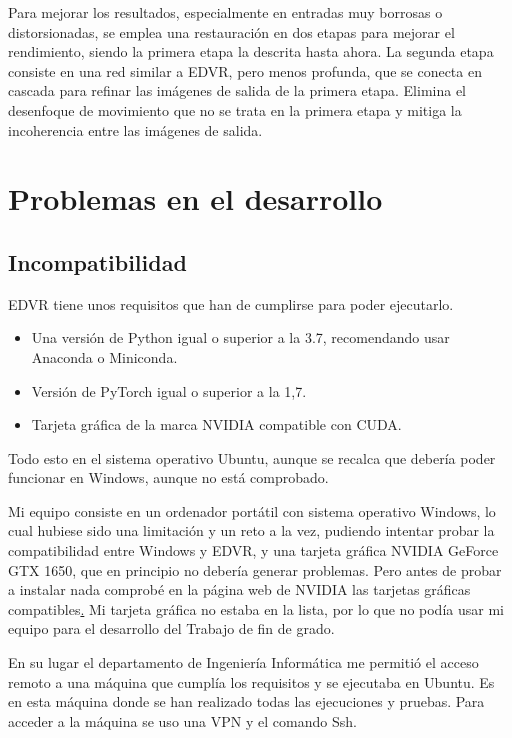         Para mejorar los resultados, especialmente en entradas muy borrosas o distorsionadas, se emplea una restauración en dos etapas para mejorar el rendimiento, siendo la primera etapa la descrita hasta ahora. La segunda etapa consiste en una red similar a EDVR, pero menos profunda, que se conecta en cascada para refinar las imágenes de salida de la primera etapa. Elimina el desenfoque de movimiento que no se trata en la primera etapa y mitiga la incoherencia entre las imágenes de salida.

\section{Problemas en el desarrollo}   
    
    \subsection {Incompatibilidad}
    EDVR tiene unos requisitos que han de cumplirse para poder ejecutarlo.
     \begin{itemize}
        \item Una versión de Python igual o superior a la 3.7, recomendando usar Anaconda o Miniconda.
        \item Versión de PyTorch igual o superior a la 1,7.
        \item Tarjeta gráfica de la marca NVIDIA compatible con CUDA.
    \end{itemize}
    Todo esto en el sistema operativo Ubuntu, aunque se recalca que debería poder funcionar en Windows, aunque no está comprobado.

    Mi equipo consiste en un ordenador portátil con sistema operativo Windows, lo cual hubiese sido una limitación y un reto a la vez, pudiendo intentar probar la compatibilidad entre Windows y EDVR, y una tarjeta gráfica NVIDIA GeForce GTX 1650, que en principio no debería generar problemas. Pero antes de probar a instalar nada comprobé en la página web de NVIDIA las tarjetas gráficas compatibles\href{https://developer.nvidia.com/cuda-gpus}. Mi tarjeta gráfica no estaba en la lista, por lo que no podía usar mi equipo para el desarrollo del Trabajo de fin de grado.

    En su lugar el departamento de Ingeniería Informática me permitió el acceso remoto a una máquina que cumplía los requisitos y se ejecutaba en Ubuntu. Es en esta máquina donde se han realizado todas las ejecuciones y pruebas. Para acceder a la máquina se uso una VPN y el comando Ssh. 
    
